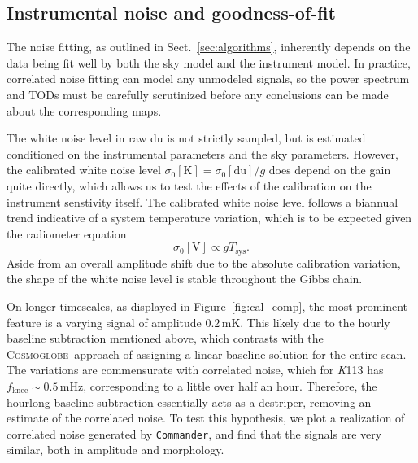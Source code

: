 \documentclass[twocolumn]{../../common/aa}
\def\commander{\texttt{Commander}}
\newcommand{\cosmoglobe}{\textsc{Cosmoglobe}}
\newcommand{\K}[0]{\textit K}
\begin{document}
\subsection{Instrumental noise and goodness-of-fit}
\label{sec:noise}





The noise fitting, as outlined in Sect.~\ref{sec:algorithms}, inherently depends on the data being fit well by both the sky model and the instrument model. In practice, correlated noise fitting can model any unmodeled signals, so the power spectrum and TODs must be carefully scrutinized before any conclusions can be made about the corresponding maps.

The white noise level in raw du is not strictly sampled, but is estimated conditioned on the instrumental parameters and the sky parameters. However, the calibrated white noise level $\sigma_0[\mathrm K]=\sigma_0[\mathrm{du}]/g$ does depend on the gain quite directly, which allows us to test the effects of the calibration on the instrument senstivity itself. The calibrated white noise level follows a biannual trend indicative of a system temperature variation, which is to be expected given the radiometer equation
\begin{equation}
	\sigma_0[\mathrm V]\propto gT_\mathrm{sys}.
\end{equation}
Aside from an overall amplitude shift due to the absolute calibration variation, the shape of the white noise level is stable throughout the Gibbs chain.

On longer timescales, as displayed in Figure~\ref{fig:cal_comp}, the most prominent feature is a varying signal of amplitude $0.2\,\mathrm{mK}$. This likely due to the hourly baseline subtraction mentioned above, which contrasts with the \cosmoglobe\ approach of assigning a linear baseline solution for the entire scan. The variations are commensurate with correlated noise, which for \K113 has ${f_\mathrm{knee}\sim0.5\,\mathrm{mHz}}$, corresponding to a little over half an hour. Therefore, the hourlong baseline subtraction essentially acts as a destriper, removing an estimate of the correlated noise. To test this hypothesis, we plot a realization of correlated noise generated by \commander, and find that the signals are very similar, both in amplitude and morphology.
\end{document}

